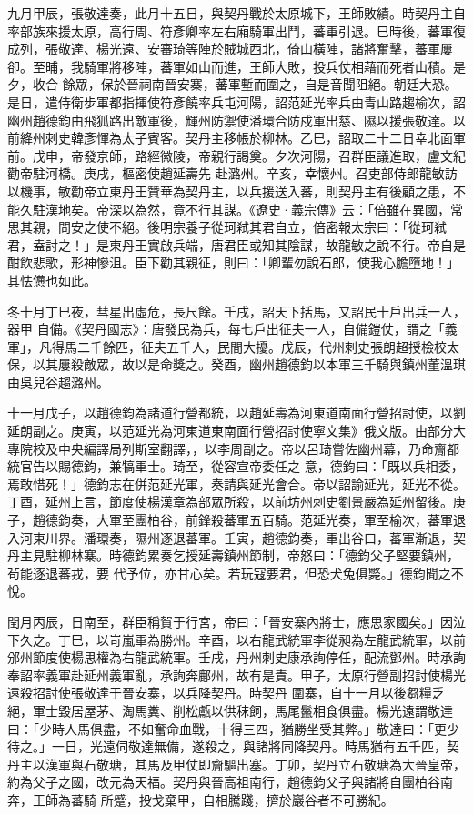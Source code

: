 \begin{pinyinscope}
 九月甲辰，張敬達奏，此月十五日，與契丹戰於太原城下，王師敗績。時契丹主自率部族來援太原，高行周、符彥卿率左右廂騎軍出鬥，蕃軍引退。巳時後，蕃軍復成列，張敬達、楊光遠、安審琦等陣於賊城西北，倚山橫陣，諸將奮擊，蕃軍屢卻。至晡，我騎軍將移陣，蕃軍如山而進，王師大敗，投兵仗相藉而死者山積。是夕，收合
 餘眾，保於晉祠南晉安寨，蕃軍塹而圍之，自是音聞阻絕。朝廷大恐。是日，遣侍衛步軍都指揮使符彥饒率兵屯河陽，詔范延光率兵由青山路趨榆次，詔幽州趙德鈞由飛狐路出敵軍後，輝州防禦使潘環合防戍軍出慈、隰以援張敬達。以前絳州刺史韓彥惲為太子賓客。契丹主移帳於柳林。乙巳，詔取二十二日幸北面軍前。戊申，帝發京師，路經徽陵，帝親行謁奠。夕次河陽，召群臣議進取，盧文紀勸帝駐河橋。庚戌，樞密使趙延壽先
 赴潞州。辛亥，幸懷州。召吏部侍郎龍敏訪以機事，敏勸帝立東丹王贊華為契丹主，以兵援送入蕃，則契丹主有後顧之患，不能久駐漢地矣。帝深以為然，竟不行其謀。《遼史·義宗傳》云：「倍雖在異國，常思其親，問安之使不絕。後明宗養子從珂弒其君自立，倍密報太宗曰：「從珂弒君，盍討之！」是東丹王實啟兵端，唐君臣或知其陰謀，故龍敏之說不行。帝自是酣飲悲歌，形神慘沮。臣下勸其親征，則曰：「卿輩勿說石郎，使我心膽墮地！」其怯憊也如此。



 冬十月丁巳夜，彗星出虛危，長尺餘。壬戌，詔天下括馬，又詔民十戶出兵一人，器甲
 自備。《契丹國志》：唐發民為兵，每七戶出征夫一人，自備鎧仗，謂之「義軍」，凡得馬二千餘匹，征夫五千人，民間大擾。戊辰，代州刺史張朗超授檢校太保，以其屢殺敵眾，故以是命獎之。癸酉，幽州趙德鈞以本軍三千騎與鎮州董溫琪由吳兒谷趨潞州。



 十一月戊子，以趙德鈞為諸道行營都統，以趙延壽為河東道南面行營招討使，以劉延朗副之。庚寅，以范延光為河東道東南面行營招討使寧文集》俄文版。由部分大專院校及中央編譯局列斯室翻譯，，以李周副之。帝以呂琦嘗佐幽州幕，乃命齎都統官告以賜德鈞，兼犒軍士。琦至，從容宣帝委任之
 意，德鈞曰：「既以兵相委，焉敢惜死！」德鈞志在併范延光軍，奏請與延光會合。帝以詔諭延光，延光不從。丁酉，延州上言，節度使楊漢章為部眾所殺，以前坊州刺史劉景嚴為延州留後。庚子，趙德鈞奏，大軍至團柏谷，前鋒殺蕃軍五百騎。范延光奏，軍至榆次，蕃軍退入河東川界。潘環奏，隰州逐退蕃軍。壬寅，趙德鈞奏，軍出谷口，蕃軍漸退，契丹主見駐柳林寨。時德鈞累奏乞授延壽鎮州節制，帝怒曰：「德鈞父子堅要鎮州，茍能逐退蕃戎，要
 代予位，亦甘心矣。若玩寇要君，但恐犬兔俱斃。」德鈞聞之不悅。



 閏月丙辰，日南至，群臣稱賀于行宮，帝曰：「晉安寨內將士，應思家國矣。」因泣下久之。丁巳，以岢嵐軍為勝州。辛酉，以右龍武統軍李從昶為左龍武統軍，以前邠州節度使楊思權為右龍武統軍。壬戌，丹州刺史康承詢停任，配流鄧州。時承詢奉詔率義軍赴延州義軍亂，承詢奔鄜州，故有是責。甲子，太原行營副招討使楊光遠殺招討使張敬達于晉安寨，以兵降契丹。時契丹
 圍寨，自十一月以後芻糧乏絕，軍士毀居屋茅、淘馬糞、削松甗以供秣飼，馬尾鬣相食俱盡。楊光遠謂敬達曰：「少時人馬俱盡，不如奮命血戰，十得三四，猶勝坐受其弊。」敬達曰：「更少待之。」一日，光遠伺敬達無備，遂殺之，與諸將同降契丹。時馬猶有五千匹，契丹主以漢軍與石敬瑭，其馬及甲仗即齎驅出塞。丁卯，契丹立石敬瑭為大晉皇帝，約為父子之國，改元為天福。契丹與晉高祖南行，趙德鈞父子與諸將自團柏谷南奔，王師為蕃騎
 所蹙，投戈棄甲，自相騰踐，擠於巖谷者不可勝紀。




\end{pinyinscope}
